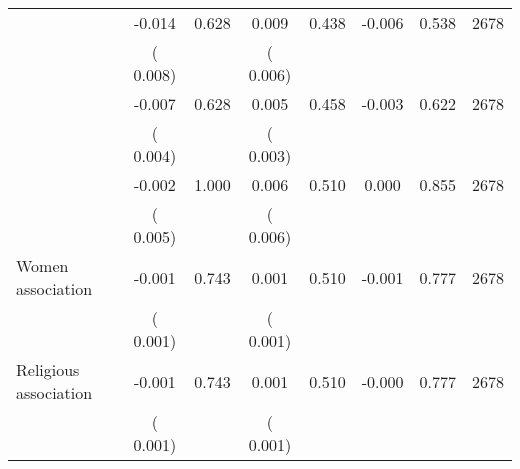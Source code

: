 \begin{tabular}{l*{7}{c}}
        &             -0.014       &        0.628  &              0.009       &        0.438  &             -0.006       &              0.538 &  2678 \\ 
                       &       (       0.008)             &                               &       (       0.006)                     &                               &                                               &                                &                      \\ 

        &             -0.007       &        0.628  &              0.005       &        0.458  &             -0.003       &              0.622 &  2678 \\ 
                       &       (       0.004)             &                               &       (       0.003)                     &                               &                                               &                                &                      \\ 

        &             -0.002       &        1.000  &              0.006       &        0.510  &              0.000       &              0.855 &  2678 \\ 
                       &       (       0.005)             &                               &       (       0.006)                     &                               &                                               &                                &                      \\ 

 Women association       &             -0.001       &        0.743  &              0.001       &        0.510  &             -0.001       &              0.777 &  2678 \\ 
                       &       (       0.001)             &                               &       (       0.001)                     &                               &                                               &                                &                      \\ 

 Religious association       &             -0.001       &        0.743  &              0.001       &        0.510  &             -0.000       &              0.777 &  2678 \\ 
                       &       (       0.001)             &                               &       (       0.001)                     &                               &                                               &                                &                      \\ 


\end{tabular}
